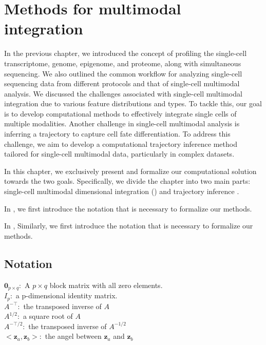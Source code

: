 %
\chapter{Methods for multimodal integration}
\label{chapter:methods_inte}
\graphicspath{{chapter3/figs}}

In the previous chapter, we introduced the concept of profiling the single-cell transcriptome, genome, epigenome, and proteome, along with simultaneous sequencing. We also outlined the common workflow for analyzing single-cell sequencing data from different protocols and that of single-cell multimodal analysis. We discussed the challenges associated with single-cell multimodal integration due to various feature distributions and types. To tackle this, our goal is to develop computational methods to effectively integrate single cells of multiple modalities. Another challenge in single-cell multimodal analysis is inferring a trajectory to capture cell fate differentiation. To address this challenge, we aim to develop a computational trajectory inference method tailored for single-cell multimodal data, particularly in complex datasets.

In this chapter, we exclusively present and formalize our computational solution towards the two goals. Specifically, we divide the chapter into two main parts: single-cell multimodal dimensional integration () and trajectory inference .

In , we first introduce the notation that is necessary to formalize our methods.

In , Similarly, we first introduce the notation that is necessary to formalize our methods.


\label{methods:integration}
\section{Notation}
$\mathbf{0}_{p\times q}: $ A $p\times q$ block matrix with all zero elements.\\
$I_p:$ a p-dimensional identity matrix.\\
$A^{-\top}:$ the transposed inverse of $A$\\
$A^{1/2}:$ a square root of $A$\\
$A^{-\top/2}:$ the transposed inverse of $A^{-1/2}$\\
$<\mathbf{z}_a, \mathbf{z}_b>:$ the angel between $\mathbf{z}_a$ and $\mathbf{z}_b$

